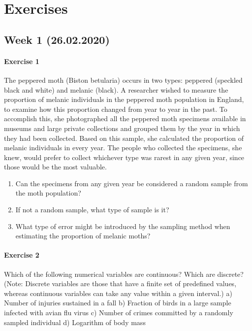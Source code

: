 \documentclass[]{article}
\let\oldparagraph\paragraph
\renewcommand{\paragraph}[1]{\oldparagraph{#1}\mbox{}}
\begin{document}
\hypertarget{exercises}{%
\section{Exercises}\label{exercises}}

\hypertarget{week-1-26.02.2020}{%
\subsection{Week 1 (26.02.2020)}\label{week-1-26.02.2020}}

\hypertarget{exercise-1}{%
\paragraph{Exercise 1}\label{exercise-1}}

The peppered moth (Biston betularia) occurs in two types: peppered
(speckled black and white) and melanic (black). A researcher wished to
measure the proportion of melanic individuals in the peppered moth
population in England, to examine how this proportion changed from year
to year in the past. To accomplish this, she photographed all the
peppered moth specimens available in museums and large private
collections and grouped them by the year in which they had been
collected. Based on this sample, she calculated the proportion of
melanic individuals in every year. The people who collected the
specimens, she knew, would prefer to collect whichever type was rarest
in any given year, since those would be the most valuable.

\begin{enumerate}
\def\labelenumi{\alph{enumi})}
\item
  Can the specimens from any given year be considered a random sample
  from the moth population?
\item
  If not a random sample, what type of sample is it?
\item
  What type of error might be introduced by the sampling method when
  estimating the proportion of melanic moths?
\end{enumerate}

\hypertarget{exercise-2}{%
\paragraph{Exercise 2}\label{exercise-2}}

Which of the following numerical variables are continuous? Which are
discrete? (Note: Discrete variables are those that have a finite set of
predefined values, whereas continuous variables can take any value
within a given interval.) a) Number of injuries sustained in a fall b)
Fraction of birds in a large sample infected with avian flu virus c)
Number of crimes committed by a randomly sampled individual d) Logarithm
of body mass
\end{document}
